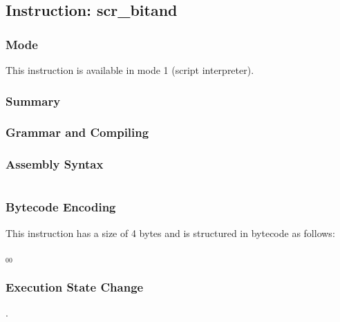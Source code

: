 \subsection{Instruction: scr\_bitand}

\subsubsection{Mode}
This instruction is available in mode 1 (script interpreter).
\subsubsection{Summary}


\subsubsection{Grammar and Compiling}


\subsubsection{Assembly Syntax}

\begin{myquote}
\begin{verbatim}

\end{verbatim}
\end{myquote}

\subsubsection{Bytecode Encoding}

This instruction has a size of 4 bytes and is structured in bytecode as follows:

$_{00}$\ 


\subsubsection{Execution State Change}

.


